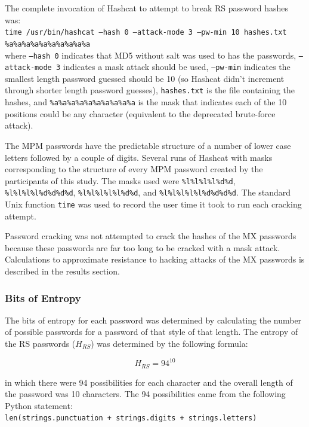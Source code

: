 \documentclass{article}
\begin{document}
The complete invocation of Hashcat to attempt to break RS password hashes was: \\

\texttt{time /usr/bin/hashcat --hash 0 --attack-mode 3 --pw-min 10 hashes.txt \%a\%a\%a\%a\%a\%a\%a\%a\%a\%a} \\

where \texttt{--hash 0} indicates that MD5 without salt was used to has the passwords, \texttt{--attack-mode 3} indicates a mask attack should be used, \texttt{--pw-min} indicates the smallest length password guessed should be 10 (so Hashcat didn't increment through shorter length password guesses), \texttt{hashes.txt} is the file containing the hashes, and \texttt{\%a\%a\%a\%a\%a\%a\%a\%a\%a\%a} is the mask that indicates each of the 10 positions could be any character (equivalent to the deprecated brute-force attack). 

The MPM passwords have the predictable structure of a number of lower case letters followed by a couple of digits. Several runs of Hashcat with masks corresponding to the structure of every MPM password created by the participants of this study. The masks used were \texttt{\%l\%l\%l\%l\%d\%d}, \texttt{\%l\%l\%l\%l\%d\%d\%d\%d}, \texttt{\%l\%l\%l\%l\%l\%d\%d}, and \texttt{\%l\%l\%l\%l\%l\%d\%d\%d\%d}. The standard Unix function \texttt{time} was used to record the user time it took to run each cracking attempt.

Password cracking was not attempted to crack the hashes of the MX passwords because these passwords are far too long to be cracked with a mask attack. Calculations to approximate resistance to hacking attacks of the MX passwords is described in the results section.

\subsubsection*{Bits of Entropy}
The bits of entropy for each password was determined by calculating the number of possible passwords for a password of that style of that length. The entropy of the RS passwords ($H_{RS}$) was determined by the following formula:

$$H_{RS} = 94^{10}$$

in which there were 94 possibilities for each character and the overall length of the password was 10 characters. The 94 possibilities came from the following Python statement: \\

\texttt{len(strings.punctuation + strings.digits + strings.letters)}
\end{document}
